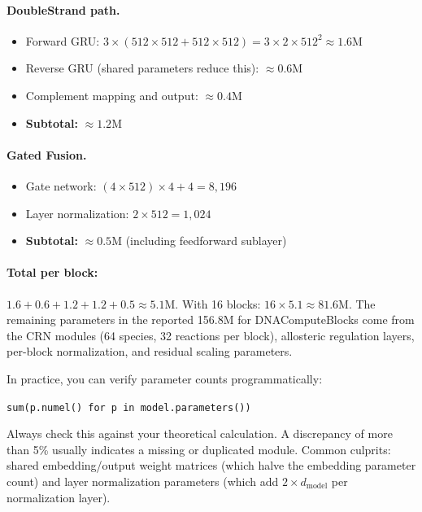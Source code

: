 \paragraph{DoubleStrand path.}
\begin{itemize}[leftmargin=1.5em]
  \item Forward GRU: $3 \times (512 \times 512 + 512 \times 512) = 3 \times 2 \times 512^2 \approx 1.6\text{M}$
  \item Reverse GRU (shared parameters reduce this): $\approx 0.6\text{M}$
  \item Complement mapping and output: $\approx 0.4\text{M}$
  \item \textbf{Subtotal:} $\approx 1.2\text{M}$
\end{itemize}

\paragraph{Gated Fusion.}
\begin{itemize}[leftmargin=1.5em]
  \item Gate network: $(4 \times 512) \times 4 + 4 = 8{,}196$
  \item Layer normalization: $2 \times 512 = 1{,}024$
  \item \textbf{Subtotal:} $\approx 0.5\text{M}$ (including feedforward sublayer)
\end{itemize}

\paragraph{Total per block:} $1.6 + 0.6 + 1.2 + 1.2 + 0.5 \approx 5.1\text{M}$. With 16 blocks: $16 \times 5.1 \approx 81.6\text{M}$. The remaining parameters in the reported 156.8M for DNAComputeBlocks come from the CRN modules (64 species, 32 reactions per block), allosteric regulation layers, per-block normalization, and residual scaling parameters.

\begin{implnote}
In practice, you can verify parameter counts programmatically:
\begin{center}
\texttt{sum(p.numel() for p in model.parameters())}
\end{center}
Always check this against your theoretical calculation. A discrepancy of more than 5\% usually indicates a missing or duplicated module. Common culprits: shared embedding/output weight matrices (which halve the embedding parameter count) and layer normalization parameters (which add $2 \times d_{\text{model}}$ per normalization layer).
\end{implnote}


